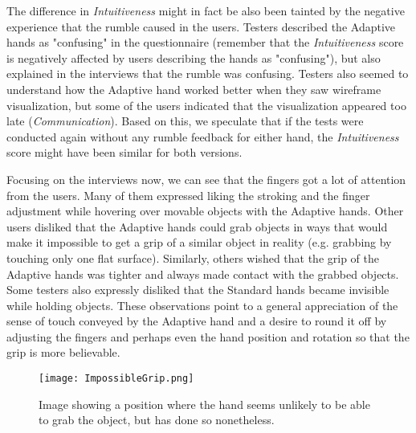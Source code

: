 The difference in \textit{Intuitiveness} might in fact be also been tainted by the negative experience that the rumble caused in the users. Testers described the Adaptive hands as "confusing" in the questionnaire (remember that the \textit{Intuitiveness} score is negatively affected by users describing the hands as "confusing"), but also explained in the interviews that the rumble was confusing. Testers also seemed to understand how the Adaptive hand worked better when they saw wireframe visualization, but some of the users indicated that the visualization appeared too late (\textit{Communication}). Based on this, we speculate that if the tests were conducted again without any rumble feedback for either hand, the \textit{Intuitiveness} score might have been similar for both versions. 

Focusing on the interviews now, we can see that the fingers got a lot of attention from the users. Many of them expressed liking the stroking and the finger adjustment while hovering over movable objects with the Adaptive hands. Other users disliked that the Adaptive hands could grab objects in ways that would make it impossible to get a grip of a similar object in reality (e.g. grabbing by touching only one flat surface). Similarly, others wished that the grip of the Adaptive hands was tighter and always made contact with the grabbed objects. Some testers also expressly disliked that the Standard hands became invisible while holding objects. These observations point to a general appreciation of the sense of touch conveyed by the Adaptive hand and a desire to round it off by adjusting the fingers and perhaps even the hand position and rotation so that the grip is more believable.

\begin{figure}[h]
\centering
\texttt{[image: ImpossibleGrip.png]}
\caption{Image showing a position where the hand seems unlikely to be able to grab the object, but has done so nonetheless.}
\label{fig:impossibleGrip}
\end{figure}


